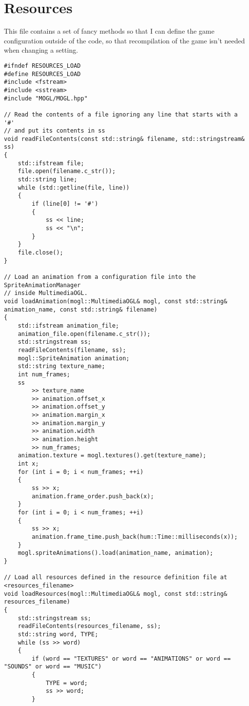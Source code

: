 \section{Resources}

This file contains a set of fancy methods so that I can define the game configuration 
outside of the code, so that recompilation of the game isn't needed when changing a setting.

\begin{lstlisting}
#ifndef RESOURCES_LOAD
#define RESOURCES_LOAD
#include <fstream>
#include <sstream>
#include "MOGL/MOGL.hpp"

// Read the contents of a file ignoring any line that starts with a '#' 
// and put its contents in ss
void readFileContents(const std::string& filename, std::stringstream& ss)
{
    std::ifstream file;
    file.open(filename.c_str());
    std::string line;
    while (std::getline(file, line))
    {
        if (line[0] != '#')
        {
            ss << line;
            ss << "\n";
        }
    }
    file.close();
}

// Load an animation from a configuration file into the SpriteAnimationManager 
// inside MultimediaOGL.
void loadAnimation(mogl::MultimediaOGL& mogl, const std::string& animation_name, const std::string& filename)
{
    std::ifstream animation_file;
    animation_file.open(filename.c_str());
    std::stringstream ss;
    readFileContents(filename, ss);
    mogl::SpriteAnimation animation;
    std::string texture_name;
    int num_frames;
    ss
        >> texture_name
        >> animation.offset_x
        >> animation.offset_y
        >> animation.margin_x
        >> animation.margin_y
        >> animation.width
        >> animation.height
        >> num_frames;
    animation.texture = mogl.textures().get(texture_name);
    int x;
    for (int i = 0; i < num_frames; ++i)
    {
        ss >> x;
        animation.frame_order.push_back(x);
    }
    for (int i = 0; i < num_frames; ++i)
    {
        ss >> x;
        animation.frame_time.push_back(hum::Time::milliseconds(x));
    }
    mogl.spriteAnimations().load(animation_name, animation);
}

// Load all resources defined in the resource definition file at <resources_filename>
void loadResources(mogl::MultimediaOGL& mogl, const std::string& resources_filename)
{
    std::stringstream ss;
    readFileContents(resources_filename, ss);
    std::string word, TYPE;
    while (ss >> word)
    {
        if (word == "TEXTURES" or word == "ANIMATIONS" or word == "SOUNDS" or word == "MUSIC")
        {
            TYPE = word;
            ss >> word;
        }


\end{lstlisting}
